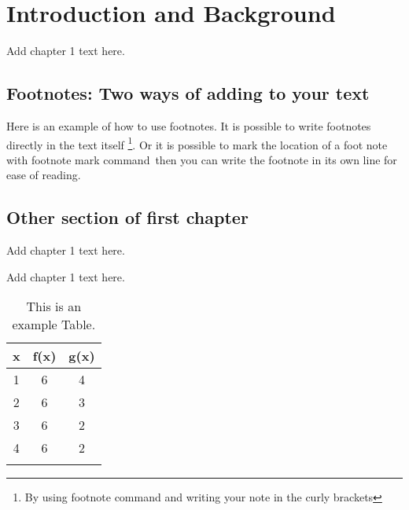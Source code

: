 \documentclass[12pt]{report}   %
\begin{document}

\chapter{Introduction and Background}
Add chapter 1 text here. 


\section{Footnotes: Two ways of adding to your text}

Here is an example of how to use footnotes. It is possible to write footnotes directly in the text itself \footnote{By using footnote command and writing your note in the curly brackets}. Or it is possible to mark the location of a foot note with footnote mark command\footnotemark \, then you can write the footnote in its own line for ease of reading. 


\section{Other section of first chapter}

Add chapter 1 text here. 



Add chapter 1 text here. 


\begin{table}
\caption{This is an example Table.}
\begin{center}
\begin{tabular}{ccc}
x & f(x) & g(x) \\
\midrule
1 & 6 & 4  \\
2 & 6 & 3  \\
3 & 6 & 2  \\
4 & 6 & 2  \\
\label{Table in Chapter 1}
\end{tabular}
\end{center}
\end{table}
\end{document}

